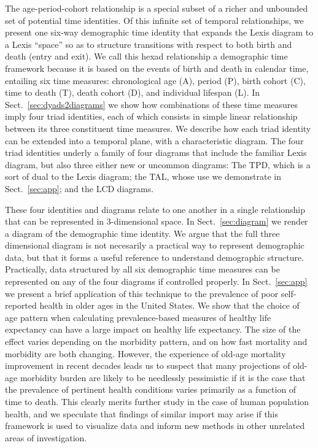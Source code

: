 \documentclass[12pt,oneside,a4paper]{article} %
\theoremstyle{definition}
\begin{document}
The age-period-cohort relationship is a special subset of a richer and unbounded
set of potential time identities. Of this infinite set of
temporal relationships, we present one six-way demographic time
identity that expands the Lexis diagram to a Lexis ``space'' so as to structure
transitions with respect to both birth and death (entry and exit). We call this
hexad relationship a demographic time framework because it is based on
the events of birth and death in calendar time, entailing six time measures:
chronological age (A), period (P), birth cohort (C), time to death (T), death cohort (D), and individual lifespan (L). In
Sect.~\ref{sec:dyads2diagrams} we show how combinations of these time measures imply four triad identities, each of which consists in simple linear relationship between its three
constituent time measures. We describe how each triad identity can be
extended into a temporal plane, with a characteristic diagram. The four triad
identities underly a family of four diagrams that include the
familiar Lexis diagram, but also three either new or
uncommon diagrams: The TPD, which is a sort of dual to the Lexis diagram; the TAL, whose use we demonstrate in Sect.~\ref{sec:app}; and the LCD diagrams.

These four identities and diagrams relate to one another in a single
relationship that can be represented in 3-dimensional space. 
In Sect.~\ref{sec:diagram} we render a diagram of the demographic time
identity. We argue that the full three dimensional diagram is not necesarily a
practical way to represent demographic data, but that it forms a useful
reference to understand demographic structure. Practically, data structured by
all six demographic time measures can be represented on any of the four diagrams
if controlled properly. In Sect.~\ref{sec:app} we present a brief
application of this technique to the prevalence of poor self-reported health in
older ages in the United States.  We show that the choice of age pattern when calculating
prevalence-based measures of healthy life expectancy can have a large impact on
healthy life expectancy. The size of the effect varies depending on the morbidity pattern, and on how fast mortality and
morbidity are both changing. However, the experience of old-age mortality
improvement in recent decades leads us to suspect that many projections of
old-age morbidity burden are likely to be needlessly pessimistic if it is the
case that the prevalence of pertinent health conditions varies primarily as a
function of time to death. This clearly merits further study in the case of human population
health, and we speculate that findings of similar import may arise if
this framework is used to visualize data and inform new methods in other
unrelated areas of investigation.
\end{document}
